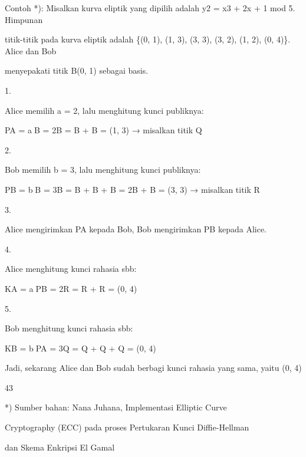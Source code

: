 \documentclass{article}
\begin{document}

Contoh *):  Misalkan kurva eliptik yang dipilih adalah y2 = x3 + 2x + 1 mod  5. Himpunan 

titik-titik pada kurva eliptik adalah \{(0, 1), (1, 3), (3, 3), (3, 2), (1, 2), (0, 4)\}. Alice dan Bob 

menyepakati titik B(0, 1) sebagai basis.

1.

Alice memilih a = 2, lalu menghitung kunci publiknya:



PA = aB = 2B = B + B = (1, 3)  → misalkan titik Q

2.

Bob memilih b = 3, lalu menghitung kunci publiknya:



PB = bB = 3B = B + B + B = 2B + B = (3, 3) → misalkan titik R

3.

Alice mengirimkan PA kepada Bob, Bob mengirimkan PB kepada Alice.

4.

Alice menghitung kunci rahasia sbb:



KA = aPB = 2R = R + R = (0, 4)

5.

 Bob menghitung kunci rahasia sbb:



KB = bPA = 3Q = Q + Q + Q = (0, 4)

Jadi, sekarang Alice dan Bob sudah berbagi kunci rahasia yang sama, yaitu (0, 4)


43

*) Sumber bahan: Nana Juhana, Implementasi Elliptic Curve 

Cryptography  (ECC) pada proses Pertukaran Kunci Diffie-Hellman 

dan Skema Enkripsi El Gamal
\end{document}
